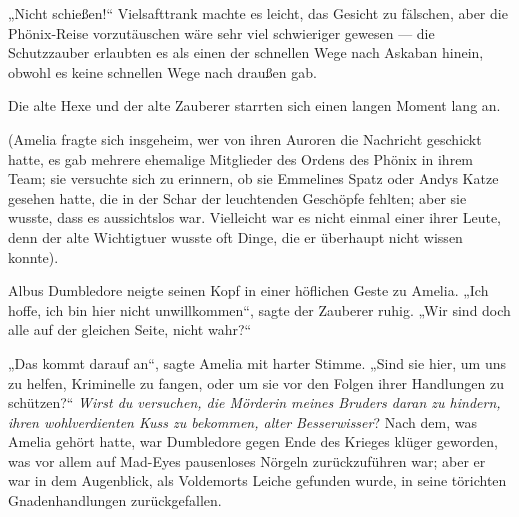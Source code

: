 „Nicht schießen!“ Vielsafttrank machte es leicht, das Gesicht zu fälschen, aber die Phönix-Reise vorzutäuschen wäre sehr viel schwieriger gewesen — die Schutzzauber erlaubten es als einen der schnellen Wege nach Askaban hinein, obwohl es keine schnellen Wege nach draußen gab.

Die alte Hexe und der alte Zauberer starrten sich einen langen Moment lang an.

(Amelia fragte sich insgeheim, wer von ihren Auroren die Nachricht geschickt hatte, es gab mehrere ehemalige Mitglieder des Ordens des Phönix in ihrem Team; sie versuchte sich zu erinnern, ob sie Emmelines Spatz oder Andys Katze gesehen hatte, die in der Schar der leuchtenden Geschöpfe fehlten; aber sie wusste, dass es aussichtslos war. Vielleicht war es nicht einmal einer ihrer Leute, denn der alte Wichtigtuer wusste oft Dinge, die er überhaupt nicht wissen konnte).

Albus Dumbledore neigte seinen Kopf in einer höflichen Geste zu Amelia.
„Ich hoffe, ich bin hier nicht unwillkommen“, sagte der Zauberer ruhig.
„Wir sind doch alle auf der gleichen Seite, nicht wahr?“

„Das kommt darauf an“, sagte Amelia mit harter Stimme.
„Sind sie hier, um uns zu helfen, Kriminelle zu fangen, oder um sie vor den Folgen ihrer Handlungen zu schützen?“ \emph{Wirst du versuchen, die Mörderin meines Bruders daran zu hindern, ihren wohlverdienten Kuss zu bekommen, alter} \emph{Besserwisser}? Nach dem, was Amelia gehört hatte, war Dumbledore gegen Ende des Krieges klüger geworden, was vor allem auf Mad-Eyes pausenloses Nörgeln zurückzuführen war; aber er war in dem Augenblick, als Voldemorts Leiche gefunden wurde, in seine törichten Gnadenhandlungen zurückgefallen.

